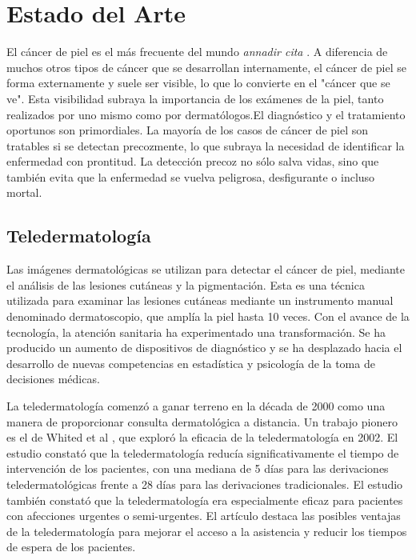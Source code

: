 \chapter{Estado del Arte}\label{chapter:state-of-the-art}

El cáncer de piel es el más frecuente del mundo \textit{annadir cita} . A diferencia de muchos otros tipos de cáncer que se 
desarrollan internamente, el cáncer de piel se forma externamente y suele ser visible, lo que lo convierte en el "cáncer que se ve". Esta visibilidad subraya 
la importancia de los exámenes de la piel, tanto realizados por uno mismo como por dermatólogos.El diagnóstico y el tratamiento oportunos son primordiales. 
La mayoría de los casos de cáncer de piel son tratables si se detectan precozmente, lo que subraya la necesidad de identificar la enfermedad con prontitud. 
La detección precoz no sólo salva vidas, sino que también evita que la enfermedad se vuelva peligrosa, desfigurante o incluso mortal.

\section{Teledermatología}

Las imágenes dermatológicas se utilizan para detectar el cáncer de piel, mediante el análisis de las lesiones cutáneas y la pigmentación. Esta es una técnica 
utilizada para examinar las lesiones cutáneas mediante un instrumento manual denominado dermatoscopio, que amplía la piel hasta 10 veces. Con el avance de la 
tecnología, la atención sanitaria ha experimentado una transformación. Se ha producido un aumento de dispositivos de diagnóstico y se ha desplazado hacia el 
desarrollo de nuevas competencias en estadística y psicología de la toma de decisiones médicas.

La teledermatología comenzó a ganar terreno en la década de 2000 como una manera de proporcionar consulta dermatológica a distancia. Un trabajo pionero 
es el de Whited et al , que exploró la eficacia de la teledermatología en 2002. El estudio constató que la teledermatología 
reducía significativamente el tiempo de intervención de los pacientes, con una mediana de 5 días para las derivaciones teledermatológicas frente a 28 días para 
las derivaciones tradicionales. El estudio también constató que la teledermatología era especialmente eficaz para pacientes con afecciones urgentes o semi-urgentes. 
El artículo destaca las posibles ventajas de la teledermatología para mejorar el acceso a la asistencia y reducir los tiempos de espera de los pacientes.


